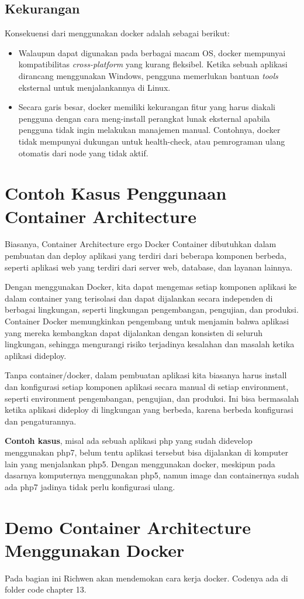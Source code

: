 \subsection{Kekurangan}
Konsekuensi dari menggunakan docker adalah sebagai berikut:
\begin{itemize}
\item Walaupun dapat digunakan pada berbagai macam OS, docker mempunyai kompatibilitas \textit{cross-platform} yang kurang fleksibel. Ketika sebuah aplikasi dirancang menggunakan Windows, pengguna memerlukan bantuan \textit{tools} eksternal untuk menjalankannya di Linux.
\item Secara garis besar, docker memiliki kekurangan fitur yang harus diakali pengguna dengan cara meng-install perangkat lunak eksternal apabila pengguna tidak ingin melakukan manajemen manual. Contohnya, docker tidak mempunyai dukungan untuk health-check, atau pemrograman ulang otomatis dari node yang tidak aktif.
\end{itemize}

\section{Contoh Kasus Penggunaan Container Architecture}

Biasanya, Container Architecture ergo Docker Container dibutuhkan dalam pembuatan dan deploy aplikasi yang terdiri dari beberapa komponen berbeda, seperti {aplikasi web} yang terdiri dari server web, database, dan layanan lainnya.

Dengan menggunakan Docker, kita dapat mengemas setiap komponen aplikasi ke dalam container yang terisolasi dan dapat dijalankan secara independen di berbagai lingkungan, seperti lingkungan pengembangan, pengujian, dan produksi. Container Docker memungkinkan pengembang untuk menjamin bahwa aplikasi yang mereka kembangkan dapat dijalankan dengan konsisten di seluruh lingkungan, sehingga mengurangi risiko terjadinya kesalahan dan masalah ketika aplikasi dideploy.

Tanpa container/docker, dalam pembuatan aplikasi kita biasanya harus install dan konfigurasi setiap komponen aplikasi secara manual di setiap environment, seperti environment pengembangan, pengujian, dan produksi. Ini bisa bermasalah ketika aplikasi dideploy di lingkungan yang berbeda, karena berbeda konfigurasi dan pengaturannya. 

\textbf{Contoh kasus}, misal ada sebuah aplikasi php yang sudah didevelop menggunakan php7, belum tentu aplikasi tersebut bisa dijalankan di komputer lain yang menjalankan php5. Dengan menggunakan docker, meskipun pada dasarnya komputernya menggunakan php5, namun image dan containernya sudah ada php7 jadinya tidak perlu konfigurasi ulang.

\section{Demo Container Architecture Menggunakan Docker}
Pada bagian ini Richwen akan mendemokan cara kerja docker. Codenya ada di folder code chapter 13.


